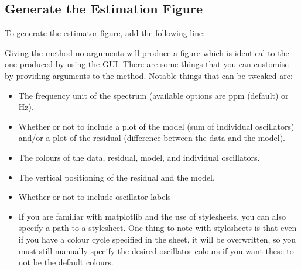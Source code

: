 \documentclass[letterpaper,10pt,english]{sphinxmanual}
\begin{document}
\subsection{Generate the Estimation Figure}
\label{\detokenize{misc/figure_customisation:generate-the-estimation-figure}}\label{\detokenize{misc/figure_customisation:id1}}
\sphinxAtStartPar
To generate the estimator figure, add the following line:

\begin{sphinxVerbatim}[commandchars=\\\{\}]
  
\end{sphinxVerbatim}

\sphinxAtStartPar
Giving the {\hyperref[\detokenize{references/core:nmrespy.core.Estimator.plot_result}]{}} method no arguments
will produce a figure which is identical to the one produced by using the GUI.
There are some things that you can customise by providing arguments to the
method. Notable things that can be tweaked are:
\begin{itemize}
\item {} 
\sphinxAtStartPar
The frequency unit of the spectrum (available options are ppm (default) or Hz).

\item {} 
\sphinxAtStartPar
Whether or not to include a plot of the model (sum of individual oscillators)
and/or a plot of the residual (difference between the data and the model).

\item {} 
\sphinxAtStartPar
The colours of the data, residual, model, and individual oscillators.

\item {} 
\sphinxAtStartPar
The vertical positioning of the residual and the model.

\item {} 
\sphinxAtStartPar
Whether or not to include oscillator labels

\item {} 
\sphinxAtStartPar
If you are familiar with matplotlib and the use of stylesheets, you can also
specify a path to a stylesheet. One thing to note with stylesheets is that
even if you have a colour cycle specified in the sheet, it will be overwritten,
so you must still manually specify the desired oscillator colours if you want
these to not be the default colours.

\end{itemize}
\end{document}
